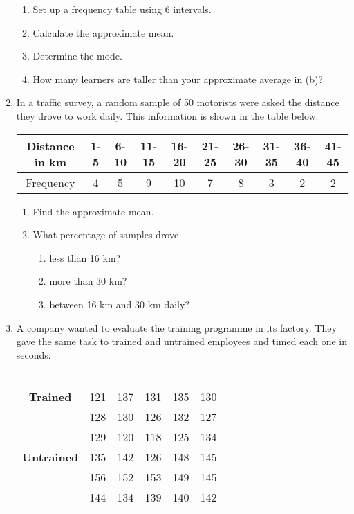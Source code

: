 \documentclass[10pt,a4paper,titlepage,twoside,openright]{report}
\begin{document}
\begin{enumerate}
{\begin{enumerate}
\item Set up a frequency table using 6 intervals.
\item Calculate the approximate mean.
\item Determine the mode.
\item How many learners are taller than your approximate average in (b)?

\end{enumerate}
}

\item{In a traffic survey, a random sample of 50 motorists were asked the distance they drove to work daily. This information is shown in the table below.
\begin{center}
\begin{tabular}{|c||c|c|c|c|c|c|c|c|c|}\hline
Distance in km & 1-5 & 6-10 & 11-15 & 16-20 & 21-25 & 26-30 & 31-35 & 36-40 & 41-45 \\\hline
Frequency & 4 & 5 & 9 & 10 & 7 & 8 & 3 & 2 & 2 \\\hline

\end{tabular}
\end{center}

\begin{enumerate}
\item Find the approximate mean.
\item{What percentage of samples drove
\begin{enumerate}
\item less than 16 km?
\item more than 30 km?
\item between 16 km and 30 km daily?
\end{enumerate}}
\end{enumerate}
}

\item{A company wanted to evaluate the training programme in its factory. They gave the same task to trained and untrained employees and timed each one in seconds.\\\\
\begin{center}
\begin{tabular}{c c c c c c}
\textbf{Trained} & 121 & 137 & 131 & 135 & 130 \\
 & 128 & 130 & 126 & 132 & 127 \\
 & 129 & 120 & 118 & 125 & 134 \\
\textbf{Untrained} & 135 & 142 & 126 & 148 & 145\\
 & 156 & 152 & 153 & 149 & 145 \\
 & 144 & 134 & 139 & 140 & 142 \\
\end{tabular}
\end{center}

}
\end{enumerate}
\end{document}
